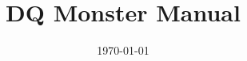 \documentclass[a4paper]{article}
\title{DQ Monster Manual}
\date{\today}
\begin{document}
\maketitle

\begin{multicols}{2}
\tableofcontents
\end{multicols}













\end{document}
